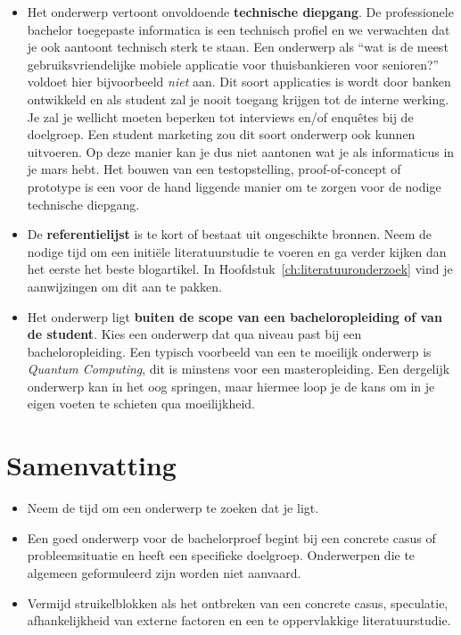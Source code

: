 \begin{itemize}
  \item Het onderwerp vertoont onvoldoende \textbf{technische diepgang}. De professionele bachelor toegepaste informatica is een technisch profiel en we verwachten dat je ook aantoont technisch sterk te staan. Een onderwerp als ``wat is de meest gebruiksvriendelijke mobiele applicatie voor thuisbankieren voor senioren?'' voldoet hier bijvoorbeeld \textit{niet} aan. Dit soort applicaties is wordt door banken ontwikkeld en als student zal je nooit toegang krijgen tot de interne werking. Je zal je wellicht moeten beperken tot interviews en/of enquêtes bij de doelgroep. Een student marketing zou dit soort onderwerp ook kunnen uitvoeren. Op deze manier kan je dus niet aantonen wat je als informaticus in je mars hebt. Het bouwen van een testopstelling, proof-of-concept of prototype is een voor de hand liggende manier om te zorgen voor de nodige technische diepgang.

  \item De \textbf{referentielijst} is te kort of bestaat uit ongeschikte bronnen. Neem de nodige tijd om een initiële literatuurstudie te voeren en ga verder kijken dan het eerste het beste blogartikel. In Hoofdstuk~\ref{ch:literatuuronderzoek} vind je aanwijzingen om dit aan te pakken.

  \item Het onderwerp ligt \textbf{buiten de scope van een bacheloropleiding of van de student}. Kies een onderwerp dat qua niveau past bij een bacheloropleiding. Een typisch voorbeeld van een te moeilijk onderwerp is \textit{Quantum Computing}, dit is minstens voor een masteropleiding. Een dergelijk onderwerp kan in het oog springen, maar hiermee loop je de kans om in je eigen voeten te schieten qua moeilijkheid.
\end{itemize}

\section{Samenvatting}%
\label{sec:onderwerp_samenvatting}

\begin{itemize}
  \item Neem de tijd om een onderwerp te zoeken dat je ligt.
  \item Een goed onderwerp voor de bachelorproef begint bij een concrete casus of probleemsituatie en heeft een specifieke doelgroep. Onderwerpen die te algemeen geformuleerd zijn worden niet aanvaard.
  \item Vermijd struikelblokken als het ontbreken van een concrete casus, speculatie, afhankelijkheid van externe factoren en een te oppervlakkige literatuurstudie.
\end{itemize}

